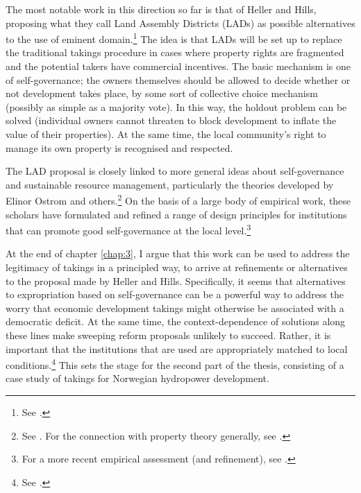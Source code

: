 The most notable work in this direction so far is that of Heller and Hills, proposing what they call Land Assembly Districts (LADs) as possible alternatives to the use of eminent domain.\footnote{See \cite{heller08}.} The idea is that LADs will be set up to replace the traditional takings procedure in cases where property rights are fragmented and the potential takers have commercial incentives. The basic mechanism is one of self-governance; the owners themselves should be allowed to decide whether or not development takes place, by some sort of collective choice mechanism (possibly as simple as a majority vote). In this way, the holdout problem can be solved (individual owners cannot threaten to block development to inflate the value of their properties). At the same time, the local community's right to manage its own property is recognised and respected.
 
The LAD proposal is closely linked to more general ideas about self-governance and sustainable resource management, particularly the theories developed by Elinor Ostrom and others.\footnote{See \cite{ostrom90}. For the connection with property theory generally, see \cite{ostrom10b,rose11,fennel11}.} On the basis of a large body of empirical work, these scholars have formulated and refined a range of design principles for institutions that can promote good self-governance at the local level.\footnote{For a more recent empirical assessment (and refinement), see \cite{cox10}.}

At the end of chapter \ref{chap:3}, I argue that this work can be used to address the legitimacy of takings in a principled way, to arrive at refinements or alternatives to the proposal made by Heller and Hills. Specifically, it seems that alternatives to expropriation based on self-governance can be a powerful way to address the worry that economic development takings might otherwise be associated with a democratic deficit. At the same time, the context-dependence of solutions along these lines make sweeping reform proposals unlikely to succeed. Rather, it is important that the institutions that are used are appropriately matched to local conditions.\footnote{See \cite[92]{ostrom90}.} This sets the stage for the second part of the thesis, consisting of a case study of takings for Norwegian hydropower development.


